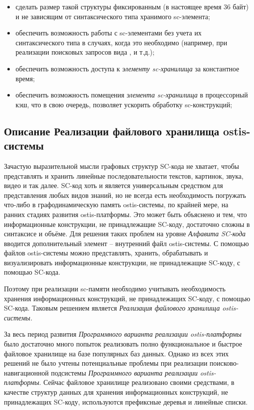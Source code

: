 \begin{itemize}
    \item сделать размер такой структуры фиксированным (в настоящее время 36 байт) и не зависящим от синтаксического типа хранимого sc-элемента;
    \item обеспечить возможность работы с sc-элементами без учета их синтаксического типа в случаях, когда это необходимо (например, при реализации поисковых запросов вида ,  и т.д.);
    \item обеспечить возможность доступа к \textit{элементу sc-хранилища} за константное время;
    \item обеспечить возможность помещения \textit{элемента sc-хранилища} в процессорный кэш, что в свою очередь, позволяет ускорить обработку sc-конструкций;
\end{itemize}

\subsection{Описание Реализации файлового хранилища ostis-системы}

Зачастую выразительной мысли графовых структур SC-кода не хватает, чтобы представлять и хранить линейные последовательности текстов, картинок, звука, видео и так далее. SC-код хоть и является универсальным средством для представления любых видов знаний, но не всегда есть необходимость погружать что-либо в графодинамическую память ostis-системы, по крайней мере, на ранних стадиях развития ostis-платформы. Это может быть объяснено и тем, что информационные конструкции, не принадлежащие SC-коду, достаточно сложны в синтаксисе и объёме. Для решения таких проблем на уровне \textit{Алфавита SC-кода\scnsupergroupsign} вводится дополнительный элемент -- внутренний файл ostis-системы. С помощью файлов ostis-системы можно представлять, хранить, обрабатывать и визуализировать информационные конструкции, не принадлежащие SC-коду, с помощью SC-кода.

Поэтому при реализации sc-памяти необходимо учитывать необходимость хранения информационных конструкций, не принадлежащих SC-коду, с помощью SC-кода. Таковым решением является \textit{Реализация файлового хранилища ostis-системы.}

За весь период развития \textit{Программного варианта реализации ostis-платформы} было достаточно много попыток реализовать полно функциональное и быстрое файловое хранилище на базе популярных баз данных. Однако из всех этих решений не было учтены потенциальные проблемы при реализации поисково-навигационной подсистемы \textit{Программного варианта реализации ostis-платформы}. Сейчас файловое хранилище реализовано своими средствами, в качестве структур данных для хранения информационных конструкций, не принадлежащих SC-коду, используются префиксные деревья \cite{bayer1977prefixBTree} и линейные списки.

